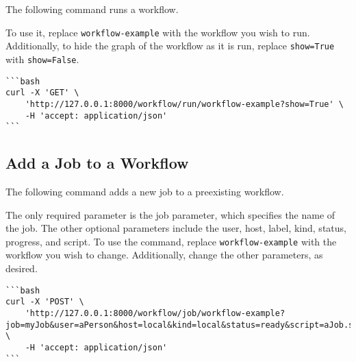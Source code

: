 The following command runs a workflow.

To use it, replace \texttt{workflow-example} with the workflow you wish
to run. Additionally, to hide the graph of the workflow as it is run,
replace \texttt{show=True} with \texttt{show=False}.

\begin{verbatim}
```bash
curl -X 'GET' \
    'http://127.0.0.1:8000/workflow/run/workflow-example?show=True' \
    -H 'accept: application/json'
```
\end{verbatim}

\subsection{Add a Job to a Workflow}\label{add-a-job-to-a-workflow}

The following command adds a new job to a preexisting workflow.

The only required parameter is the job parameter, which specifies the
name of the job. The other optional parameters include the user, host,
label, kind, status, progress, and script. To use the command, replace
\texttt{workflow-example} with the workflow you wish to change.
Additionally, change the other parameters, as desired.

\begin{verbatim}
```bash
curl -X 'POST' \
    'http://127.0.0.1:8000/workflow/job/workflow-example?job=myJob&user=aPerson&host=local&kind=local&status=ready&script=aJob.sh&progress=0&label=aLabel' \
    -H 'accept: application/json'
```
\end{verbatim}
